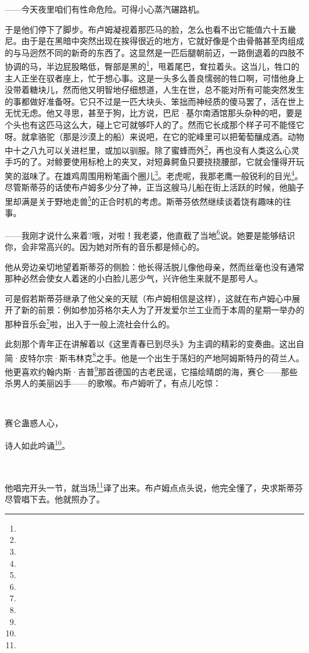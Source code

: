 \par ——今天夜里咱们有性命危险。可得小心蒸汽碾路机。
\par 于是他们停下了脚步。布卢姆凝视着那匹马的脸，怎么也看不出它能值六十五畿尼。由于是在黑暗中突然出现在挨得很近的地方，它就好像是个由骨骼甚至肉组成的与马迥然不同的新奇的东西了。这显然是一匹后腿朝前迈，一路倒退着的四肢不协调的马，半边屁股略低，臀部是黑的\footnote{}，甩着尾巴，耷拉着头。这当儿，牲口的主人正坐在驭者座上，忙于想心事。这是一头多么善良懦弱的牲口啊，可惜他身上没带着糖块儿，然而他又明智地仔细想道，人生在世，总不能对所有可能突然发生的事都做好准备呀。它只不过是一匹大块头、笨拙而神经质的傻马罢了，活在世上无忧无虑。他又寻思，甚至于狗，比方说，巴尼·基尔南酒馆那头杂种的吧，要是个头也有这匹马这么大，碰上它可就够吓人的了。然而它长成那个样子可不能怪它呀。就拿骆驼（那是沙漠上的船）来说吧，在它的驼峰里可以把葡萄釀成酒。动物中十之八九可以关进栏里，或加以驯服。除了蜜蜂而外\footnote{}，再也没有人类这么心灵手巧的了。对鲸要使用标枪上的夹叉，对短鼻鳄鱼只要挠挠腰部，它就会懂得开玩笑的滋味了。在雄鸡周围用粉笔画个圈儿\footnote{}。老虎呢，我那老鹰一般锐利的目光\footnote{}。尽管斯蒂芬的话使布卢姆多少分了神，正当这艘马儿船在街上活跃的时候，他脑子里却满是关于野地走兽\footnote{}的正合时机的考虑。斯蒂芬依然继续谈着饶有趣味的往事。
\par ——我刚才说什么来着?哦，对啦！我老婆，他直截了当地\footnote{}说。她要是能够结识你，会非常高兴的。因为她对所有的音乐都是倾心的。
\par 他从旁边亲切地望着斯蒂芬的侧脸：他长得活脱儿像他母亲，然而丝毫也没有通常那种必然会使女人着迷的小白脸儿恶少气，兴许他生来就不是那号人。
\par 可是假若斯蒂芬继承了他父亲的天赋（布卢姆相信是这样），这就在布卢姆心中展开了新的前景：例如参加芬格尔夫人为了开发爱尔兰工业而于本周的星期一举办的那种音乐会\footnote{}啦，出入于一般上流社会什么的。
\par 此刻那个青年正在讲解着以《这里青春已到尽头》为主调的精彩的变奏曲。这出自简·皮特尔宗·斯韦林克\footnote{}之手。他是一个出生于荡妇的产地阿姆斯特丹的荷兰人。他更喜欢约翰内斯·吉普\footnote{}那首德国的古老民谣，它描绘晴朗的海，赛仑——那些杀男人的美丽凶手——的歌喉。布卢姆听了，有点儿吃惊：
\par  
\par 赛仑蛊惑人心，
\par 诗人如此吟诵\footnote{}。
\par  
\par 他唱完开头一节，就当场\footnote{}译了出来。布卢姆点点头说，他完全懂了，央求斯蒂芬尽管唱下去。他就照办了。
